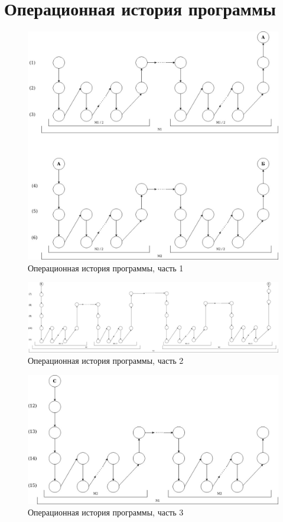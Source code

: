 \documentclass[12pt]{report}
\begin{document}
\section{Операционная история программы}

\begin{figure}[h]
	\centering
	\includegraphics[scale=0.46]{oper_history_1.jpg}
	\caption{Операционная история программы, часть 1}
	\label{fig:mpr}
\end{figure}

\begin{figure}[h]
	\centering
	\includegraphics[scale=0.25]{oper_history_2.jpg}
	\caption{Операционная история программы, часть 2}
	\label{fig:mpr}
\end{figure}

\begin{figure}[h]
	\centering
	\includegraphics[scale=0.48]{oper_history_3.jpg}
	\caption{Операционная история программы, часть 3}
	\label{fig:mpr}
\end{figure}
\end{document}
